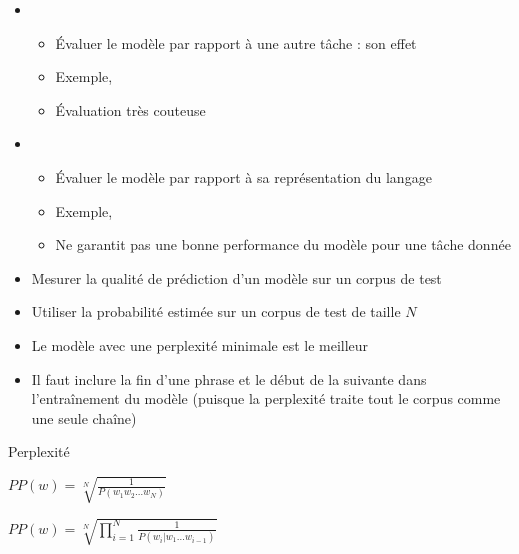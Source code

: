 \documentclass{KodeBook}
\begin{document}
	
	\begin{itemize}
		\item {}
		\begin{itemize}
			\item Évaluer le modèle par rapport à une autre tâche : son effet
			\item Exemple,  
			\item Évaluation très couteuse
		\end{itemize}
		\item {}
		\begin{itemize}
			\item Évaluer le modèle par rapport à sa représentation du langage
			\item Exemple,  
			\item Ne garantit pas une bonne performance du modèle pour une tâche donnée
		\end{itemize}
	\end{itemize}

\begin{itemize}
	\item Mesurer la qualité de prédiction d'un modèle sur un corpus de test
	\item Utiliser la probabilité estimée sur un corpus de test de taille $N$
	\item Le modèle avec une perplexité minimale est le meilleur
	\item Il faut inclure la fin d'une phrase et le début de la suivante dans l'entraînement du modèle (puisque la perplexité traite tout le corpus comme une seule chaîne)
\end{itemize}

\begin{block}{Perplexité}
	\begin{center}
		$PP(w) = \sqrt[N]{\frac{1}{P(w_1 w_2 \ldots w_N)}}$
		
		$PP(w) = \sqrt[N]{\prod\limits_{i=1}^{N}\frac{1}{P(w_i | w_1 \ldots w_{i-1})}}$
	\end{center}
\end{block}






\begin{discussion}



\end{discussion}

\ifx\wholebook\relax\else
% 
% 
	
\end{document}
